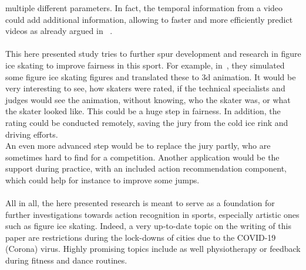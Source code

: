 multiple different
parameters.
In fact, the temporal information from a video could add additional information, allowing to faster and more efficiently
predict videos as already argued in ~\cite{staf}.
\\\mbox{}\\
This here presented study tries to further spur development and research in figure ice skating to improve
fairness in this sport.
For example, in~\cite{figureskatingsimulation}, they simulated some figure ice skating figures and translated these
to 3d
animation. It would be very interesting to see, how skaters were rated, if the technical specialists and judges would
see
the animation, without knowing, who the skater was, or what the skater looked like.
This could be a huge step in fairness.
In addition, the rating could be conducted remotely, saving the jury from the cold
ice rink and driving efforts.\\
An even more advanced step would be to replace the jury partly, who are sometimes hard to find for a competition.
Another application would be the support during practice, with an included action recommendation component, which
could help for instance to improve some jumps.
\\\mbox{}\\
All in all, the here presented research is meant to serve as a foundation for further investigations towards action
recognition
in sports, especially artistic ones such as figure ice skating.
Indeed, a very up-to-date topic on the writing of this paper are restrictions during the lock-downs of cities due to the
COVID-19 (Corona) virus.
Highly promising topics include as well physiotherapy or feedback during fitness and dance routines.
